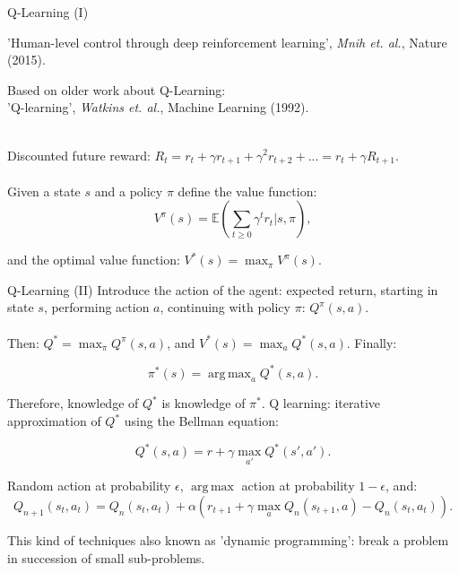 \documentclass{beamer}
\DeclareMathOperator*{\argmax}{arg\,max}
\begin{document}
\begin{frame}{Q-Learning (I)}
    \begin{center}
      'Human-level control through deep reinforcement learning', \textit{Mnih et. al.}, Nature (2015). \\
    \end{center}

    \begin{center}
      Based on older work about Q-Learning: \\ 'Q-learning', \textit{Watkins et. al.}, Machine Learning (1992). \\~\\
    \end{center}

    Discounted future reward: $R_t = r_t + \gamma r_{t+1} + \gamma^2 r_{t+2} + ... = r_t + \gamma R_{t+1}$. \\~\\

    Given a state $s$ and a policy $\pi$ define the value function: \\
    $$V^{\pi}(s) = \mathbb{E} \left( \sum_{t \geq 0} \gamma^t r_t | s, \pi \right),$$

    and the optimal value function: $V^{*}(s) = \max_{\pi} V^{\pi}(s)$.
\end{frame}



\begin{frame}{Q-Learning (II)}
    Introduce the action of the agent: expected return, starting in state $s$, performing action $a$, continuing with policy $\pi$: $Q^{\pi}(s, a)$. \\~\\

    Then: $Q^{*} = \max_{\pi} Q^{\pi}(s, a)$, and $V^{*}(s) = \max_{a} Q^{*}(s, a)$. Finally:

    $$\pi^{*}(s) = \argmax_{a} Q^{*}(s, a).$$

    Therefore, knowledge of $Q^{*}$ is knowledge of $\pi^{*}$. Q learning: iterative approximation of $Q^{*}$ using the Bellman equation:

    $$ Q^{*}(s, a) = r + \gamma \max_{a'} Q^{*}(s', a').$$

    Random action at probability $\epsilon$, $\argmax$ action at probability $1 - \epsilon$, and:
    $$Q_{n+1}(s_t, a_t) = Q_n(s_t, a_t) + \alpha (r_{t+1} + \gamma \max_{a} Q_n(s_{t+1}, a) - Q_n(s_t, a_t)).$$
    
    This kind of techniques also known as 'dynamic programming': break a problem in succession of small sub-problems.
\end{frame}
\end{document}
